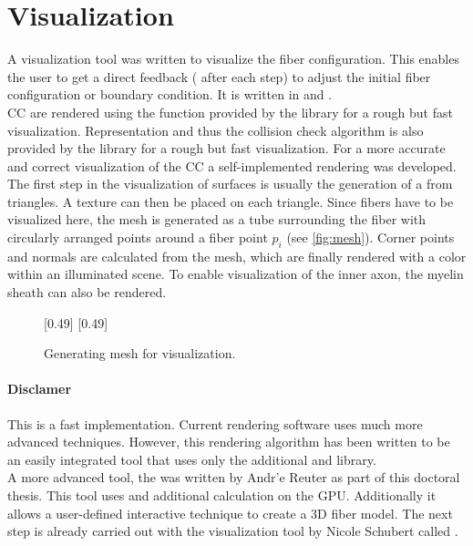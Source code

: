 \section{Visualization}\label{sec:visualization}
% 
A visualization tool was written to visualize the fiber configuration.
This enables the user to get a direct feedback (\eg{} after each step) to adjust the initial fiber configuration or boundary condition.
It is written in \cpp{} and \opengl{} \cite{isocpp, khronos}.
\\
% 
\ac{CC} are rendered using the  function provided by the  library for a rough but fast visualization.
Representation and thus the collision check algorithm is also provided by the  library for a rough but fast visualization.
For a more accurate and correct visualization of the \ac{CC} a self-implemented rendering was developed.
The first step in the visualization of surfaces is usually the generation of a  from triangles.
A texture can then be placed on each triangle.
Since fibers have to be visualized here, the mesh is generated as a tube surrounding the fiber with circularly arranged points around a fiber point $p_i$ (see \cref{fig:mesh}).
Corner points and normals are calculated from the mesh, which are finally rendered with a color within an illuminated scene.
To enable visualization of the inner axon, the myelin sheath can also be rendered.

% 
\begin{figure}[!t]
    \setlength{\tikzwidth}{0.5\textwidth}
    [0.49\textwidth]{
    }
    [0.49\textwidth]{
    }
	\caption{Generating mesh for visualization.}
	\label{fig:vis_mesh}
\end{figure}
% 
\paragraph{Disclamer}
This is a fast implementation.
Current rendering software uses much more advanced techniques.
However, this rendering algorithm has been written to be an easily integrated tool that uses only the additional  and  library.
\\
% 
A more advanced tool, the  \cite{Reuter2019} was written by Andr'e Reuter as part of this doctoral thesis.
This tool uses  and additional calculation on the GPU. Additionally it allows a user-defined interactive technique to create a 3D fiber model.
The next step is already carried out with the visualization tool by Nicole Schubert called .
% 
